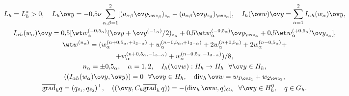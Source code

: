 \begin{gather*}


L_h=L_h^*>0,\quad L_h\ov y=-0{,}5\nu\sum_{\alpha,


\beta=1}^2[(a_{\alpha\beta}\ov y_{\ov z_\beta})_{z_\alpha}+


(a_{\alpha\beta}\ov y_{z_\beta})_{\ov z_\alpha}],\quad


I_h(\ov w)\ov y=\sum_{\alpha=1}^2I_{\alpha h}(w_\alpha)\ov y,\\


%


I_{\alpha h}(w_\alpha)\ov y=0{,}5[\wt w_\alpha^{(-0{,}5_\alpha)}(\ov y+


\ov y^{(-1_\alpha)}/2)_{z_\alpha}


+0{,}5\wt w_\alpha^{(-0{,}5_\alpha)}\ov y_{\ov z_\alpha}+


0{,}5\wt w_\alpha^{(+0{,}5_\alpha)}\ov y_{z_\alpha}],\\


%


\wt w^{(n_\alpha)}= (w_\alpha^{(n+0{,}5_\alpha,+1_{3-\alpha})}+


w_\alpha^{(n-0{,}5_\alpha,+1_{3-\alpha})}+


2w_\alpha^{(n+0{,}5_\alpha)}+2w_\alpha^{(n-0{,}5_\alpha)}+ \\ +


w_\alpha^{(n+0{,}5_\alpha,-1_{3-\alpha})}+


w_\alpha^{(n-0{,}5_\alpha,-1_{3-\alpha})})/8, \\


%


n_\alpha=\pm0{,}5_\alpha,\quad \alpha=1,2,\quad I_h(\ov w):H_h\to H_h


\ \ \forall \ov y\in H_h, \\


%


((I_{\alpha h}(w_\alpha)\ov y,\ov y))=0


\ \ \forall\ov y\in H_h,\quad \Div_h\ov w=


w_{1\ov z_1}+w_{2\ov z_2}, \\


%


{\overline{\grad}}_h q=(q_{\tilde


z_1},q_{\tilde z_2})^\top,


\quad ((\ov y,C_h{\overline{\grad}}_h\,q))=-(\Div_h\ov w, q)_{G_h}


\ \ \forall \ov y\in H_h^0,\quad q\in G_h.


\end{gather*}


